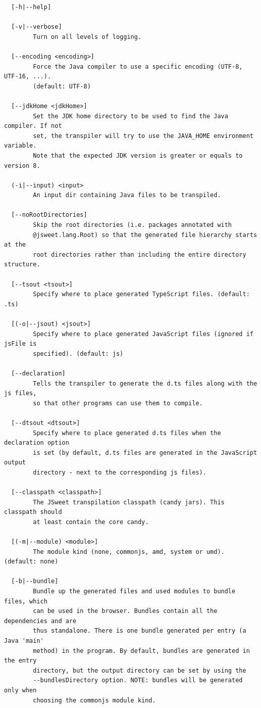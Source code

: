 \documentclass[a4paper]{report}
\begin{document}
\begin{verbatim}
  [-h|--help]

  [-v|--verbose]
        Turn on all levels of logging.

  [--encoding <encoding>]
        Force the Java compiler to use a specific encoding (UTF-8, UTF-16, ...).
        (default: UTF-8)

  [--jdkHome <jdkHome>]
        Set the JDK home directory to be used to find the Java compiler. If not
        set, the transpiler will try to use the JAVA_HOME environment variable.
        Note that the expected JDK version is greater or equals to version 8.

  (-i|--input) <input>
        An input dir containing Java files to be transpiled.

  [--noRootDirectories]
        Skip the root directories (i.e. packages annotated with
        @jsweet.lang.Root) so that the generated file hierarchy starts at the
        root directories rather than including the entire directory structure.

  [--tsout <tsout>]
        Specify where to place generated TypeScript files. (default: .ts)

  [(-o|--jsout) <jsout>]
        Specify where to place generated JavaScript files (ignored if jsFile is
        specified). (default: js)

  [--declaration]
        Tells the transpiler to generate the d.ts files along with the js files,
        so that other programs can use them to compile.

  [--dtsout <dtsout>]
        Specify where to place generated d.ts files when the declaration option
        is set (by default, d.ts files are generated in the JavaScript output
        directory - next to the corresponding js files).

  [--classpath <classpath>]
        The JSweet transpilation classpath (candy jars). This classpath should
        at least contain the core candy.

  [(-m|--module) <module>]
        The module kind (none, commonjs, amd, system or umd). (default: none)

  [-b|--bundle]
        Bundle up the generated files and used modules to bundle files, which
        can be used in the browser. Bundles contain all the dependencies and are
        thus standalone. There is one bundle generated per entry (a Java 'main'
        method) in the program. By default, bundles are generated in the entry
        directory, but the output directory can be set by using the
        --bundlesDirectory option. NOTE: bundles will be generated only when
        choosing the commonjs module kind.


\end{verbatim}
\end{document}
